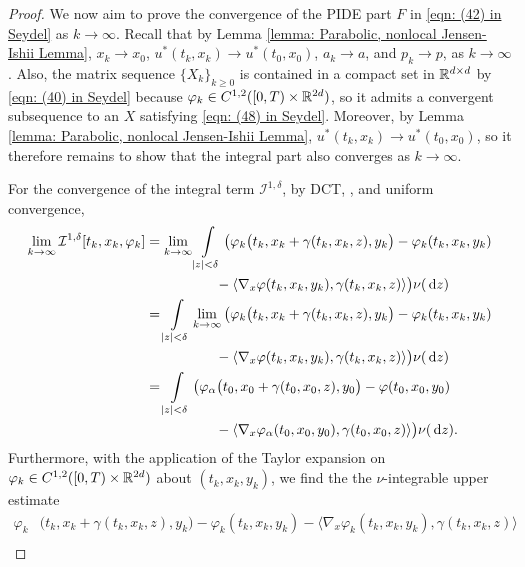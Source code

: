 \begin{proof}
    We now aim to prove the convergence of the PIDE part $F$ in \eqref{eqn: (42) in Seydel} as $k \rightarrow \infty$. Recall that by Lemma \ref{lemma: Parabolic, nonlocal Jensen-Ishii Lemma}, $x_k \rightarrow x_0$, $u^*(t_k,x_k) \rightarrow u^*(t_0,x_0)$, $a_k \rightarrow a$, and $p_k \rightarrow p$, as $k \rightarrow \infty$. Also, the matrix sequence $\{X_k\}_{k \geq 0}$ is contained in a compact set in $\mathbb{R}^{d \times d}$ by \eqref{eqn: (40) in Seydel} because $\varphi_k \in C^{1,2}([0,T) \times \mathbb{R}^{2d})$, so it admits a convergent subsequence to an $X$ satisfying \eqref{eqn: (48) in Seydel}. Moreover, by Lemma \ref{lemma: Parabolic, nonlocal Jensen-Ishii Lemma}, $u^*(t_k,x_k) \rightarrow u^*(t_0,x_0)$, so it therefore remains to show that the integral part also converges as $k \rightarrow \infty$. 

    For the convergence of the integral term $\mathcal{I}^{1,\delta}$, by DCT, , and uniform convergence, 
    \begin{align*}
        \lim_{k \rightarrow \infty} \mathcal{I}^{1,\delta}[t_k,x_k,\varphi_k] &= \lim_{k \rightarrow \infty} \int\limits \limits_{|z| < \delta} \big( \varphi_k \big( t_k,x_k+\gamma(t_k,x_k,z), y_k \big) - \varphi_k(t_k,x_k,y_k) \\
        & \qquad \qquad \quad - \langle \nabla_x \varphi(t_k,x_k,y_k), \gamma(t_k,x_k,z) \rangle \big) \nu (\,\mathrm{d} z) \\
        &= \int\limits_{|z|<\delta} \lim_{k \rightarrow \infty} \big( \varphi_k \big( t_k,x_k+\gamma(t_k,x_k,z), y_k \big) - \varphi_k(t_k,x_k,y_k) \\
        & \qquad \qquad \quad -\langle \nabla_x \varphi(t_k,x_k,y_k), \gamma(t_k,x_k,z) \rangle \big) \nu (\,\mathrm{d} z) \\
        &= \int\limits_{|z|<\delta} \big( \varphi_\alpha\big(t_0,x_0+\gamma(t_0,x_0,z),y_0\big) - \varphi(t_0,x_0,y_0) \\
        & \qquad \qquad \quad -\langle \nabla_x \varphi_\alpha(t_0,x_0,y_0), \gamma(t_0,x_0,z) \rangle \big) \nu(\,\mathrm{d} z).
    \end{align*}
    Furthermore, with the application of the Taylor expansion on $\varphi_k \in C^{1,2}([0,T) \times \mathbb{R}^{2d})$ about $(t_k,x_k,y_k)$, we find the the $\nu$-integrable upper estimate 
    \begin{align*}
        \varphi_k&\big(t_k,x_k+\gamma(t_k,x_k,z),y_k\big) - \varphi_k(t_k,x_k,y_k) - \langle \nabla_x \varphi_k (t_k,x_k,y_k), \gamma(t_k,x_k,z) \rangle \\

\end{align*}
\end{proof}
